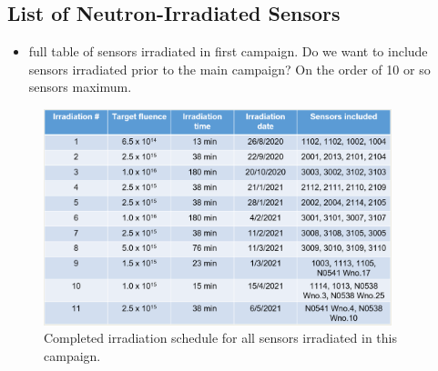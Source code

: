 \subsection{List of Neutron-Irradiated Sensors}
\begin{itemize}
  \item full table of sensors irradiated in first campaign. Do we want to include sensors irradiated prior to the main campaign? On the order of 10 or so sensors maximum.
\end{itemize}

\begin{figure}[!hbt]
  \begin{center}
    \includegraphics[width=0.90\textwidth]{figures/Completed_Irradiation_Schedule_at_RINSC}
    \caption{Completed irradiation schedule for all sensors irradiated in this campaign.}
    \label{fig:Irradiation_Schedule}
  \end{center}
\end{figure}

\label{subsec:sensors_irradiation}
